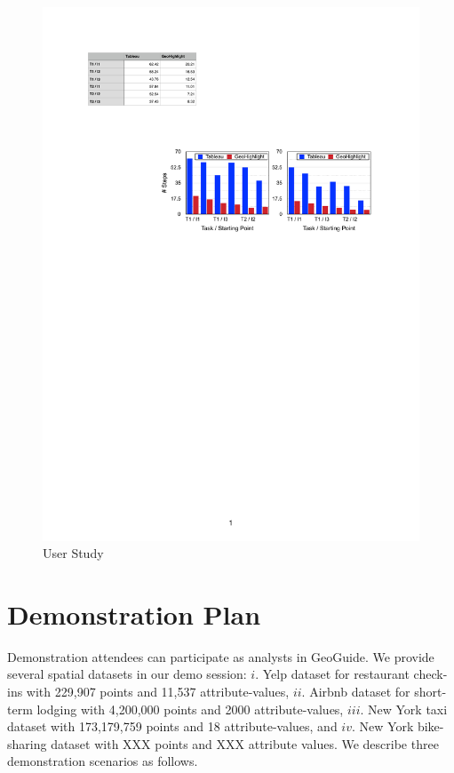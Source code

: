 \documentclass{vldb}
\newcommand{\framework}{{\sc GeoGuide}}
\begin{document}
\begin{figure}[t]
 \centering
 \includegraphics[width=\columnwidth]{figs/userstudy}
\caption{User Study}
\vspace{-5pt}
\label{fig:userstudy}
\end{figure}



\section{Demonstration Plan}
Demonstration attendees can participate as analysts in \framework. We provide several spatial datasets in our demo session: $i.$ Yelp dataset for restaurant check-ins with 229,907 points and 11,537 attribute-values, $ii.$ Airbnb dataset for short-term lodging with 4,200,000 points and 2000 attribute-values, $iii.$ New York taxi dataset with 173,179,759 points and 18 attribute-values, and $iv.$ New York bike-sharing dataset with XXX points and XXX attribute values. We describe three demonstration scenarios as follows.
\end{document}

